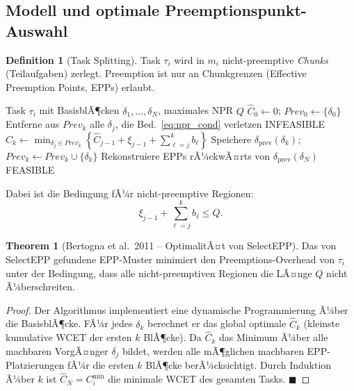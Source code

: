 ﻿\documentclass[a4paper,12pt]{report}
\theoremstyle{definition}
\newtheorem{definition}{Definition}[chapter]
\newtheorem{theorem}{Theorem}[chapter]
\begin{document}
\subsection{Modell und optimale Preemptionspunkt-Auswahl}

\begin{definition}[Task Splitting]
	Task $\tau_i$ wird in $m_i$ nicht-preemptive \emph{Chunks} (Teilaufgaben) zerlegt.
	Preemption ist nur an Chunkgrenzen (Effective Preemption Points, EPPs) erlaubt.
\end{definition}

\begin{algorithm}[H]
	\caption{SelectEPP -- Optimale Preemptionspunktauswahl (Bertogna et al.\ 2011)}
	\begin{algorithmic}[1]
		\Require Task $\tau_i$ mit BasisblÃ¶cken $\delta_1,\ldots,\delta_N$, maximales NPR $Q$
		\State $\hat{C}_0 \leftarrow 0$; $\mathit{Prev}_0 \leftarrow \{\delta_0\}$
		\State Entferne aus $\mathit{Prev}_k$ alle $\delta_j$, die Bed.~\eqref{eq:npr_cond} verletzen
		 \Return INFEASIBLE \EndIf
		\State $\hat{C}_k \leftarrow \min_{\delta_j \in \mathit{Prev}_k}\left\{\hat{C}_{j-1} + \xi_{j-1} + \sum_{\ell=j}^{k} b_\ell\right\}$
		\State Speichere $\delta_{\mathrm{prev}}(\delta_k)$; $\mathit{Prev}_k \leftarrow \mathit{Prev}_k \cup \{\delta_k\}$
		\EndFor
		\State Rekonstruiere EPPs rÃ¼ckwÃ¤rts von $\delta_{\mathrm{prev}}(\delta_N)$
		\State \Return FEASIBLE
	\end{algorithmic}
\end{algorithm}

Dabei ist die Bedingung fÃ¼r nicht-preemptive Regionen:
\begin{equation}
	\xi_{j-1} + \sum_{\ell=j}^{k} b_\ell \leq Q.
	\label{eq:npr_cond}
\end{equation}

\begin{theorem}[Bertogna et al.\ 2011 -- OptimalitÃ¤t von SelectEPP]
	Das von SelectEPP gefundene EPP-Muster minimiert den Preemptions-Overhead
	von $\tau_i$ unter der Bedingung, dass alle nicht-preemptiven Regionen die
	LÃ¤nge $Q$ nicht Ã¼berschreiten.
\end{theorem}

\begin{proof}
	Der Algorithmus implementiert eine dynamische Programmierung Ã¼ber die
	BasisblÃ¶cke. FÃ¼r jedes $\delta_k$ berechnet er das global optimale $\hat{C}_k$
	(kleinste kumulative WCET der ersten $k$ BlÃ¶cke). Da $\hat{C}_k$ das Minimum
	Ã¼ber alle machbaren VorgÃ¤nger $\delta_j$ bildet, werden alle mÃ¶glichen
	machbaren EPP-Platzierungen fÃ¼r die ersten $k$ BlÃ¶cke berÃ¼cksichtigt.
	Durch Induktion Ã¼ber $k$ ist $\hat{C}_N = C_i^{\min}$ die minimale WCET
	des gesamten Tasks. \hfill$\blacksquare$
\end{proof}
\end{document}
